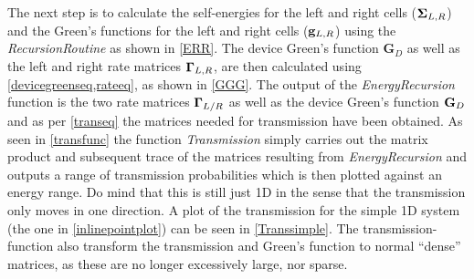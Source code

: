 \vspace{-.5\baselineskip}
\vspace{\baselineskip}
The next step is to calculate the self-energies for the left and right cells (\(\vb{\Sigma}_{L,R}\)) and the Green's functions for the left and right cells (\(\vb{g}_{L,R}\)) using the \textit{RecursionRoutine} as shown in \cref{ERR}.
\vspace{-.5\baselineskip}
\vspace{\baselineskip}
The device Green's function \(\textbf{G}_D\) as well as the left and right rate matrices \(\vb{\Gamma}_{L,R}\), are then calculated using \cref{devicegreenseq,rateeq}, as shown in \cref{GGG}.
\vspace{-.5\baselineskip}
\vspace{\baselineskip}
The output of the \textit{EnergyRecursion} function is the two rate matrices \(\vb{\Gamma}_{L/R}\) as well as the device Green's function \(\vb{G}_D\) and as per \cref{transeq} the matrices needed for transmission have been obtained. As seen in \cref{transfunc} the function \textit{Transmission} simply carries out the matrix product and subsequent trace of the matrices resulting from \textit{EnergyRecursion} and outputs a range of transmission probabilities which is then plotted against an energy range. Do mind that this is still just 1D in the sense that the transmission only moves in one direction. A plot of the transmission for the simple 1D system (the one in \cref{inlinepointplot}) can be seen in \cref{Transsimple}.
\vspace{-.5\baselineskip}
\vspace{\baselineskip}
The transmission-function also transform the transmission and Green's function to normal ``dense'' matrices, as these are no longer excessively large, nor sparse.
